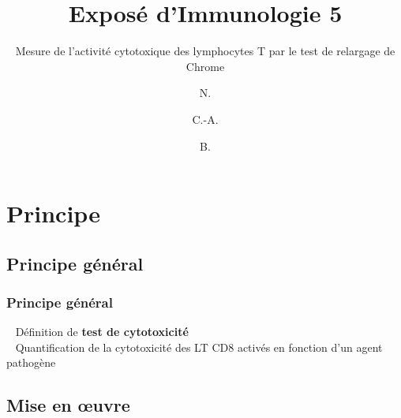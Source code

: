 \documentclass[12pt]{beamer}
\author{N. \bsc{Ribero-Rios} \and C.-A. \bsc{Romain} \and B. \bsc{Rouger}}
\title{Exposé d'Immunologie 5}
\subtitle{Mesure de l’activité cytotoxique des lymphocytes T par le test de relargage de Chrome}
\date{}
\begin{document}
\maketitle


\begin{frame}
  \transuncover
  \tableofcontents
\end{frame}


\section{Principe}
\subsection{Principe général}
\begin{frame}
  \transuncover
  \frametitle{Principe général}
  
  \textbullet~ Définition de \textbf{test de cytotoxicité}\\
  \vfill
  \textbullet~ Quantification de la cytotoxicité des LT CD8 activés en fonction d'un agent pathogène
  
\end{frame}


\subsection{Mise en \oe{}uvre}

\end{document}

